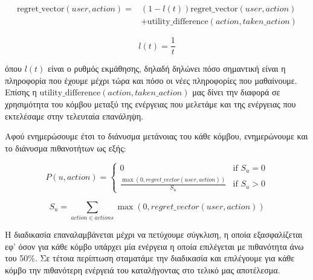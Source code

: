 \begin{equation}
\begin{split}
    \text{regret\_vector}(user, action) =& \left(1 - l(t)\right) \text{regret\_vector}(user, action)\\
    &+ \text{utility\_difference}(action, taken\_action)
\end{split}
\label{eq27}
\end{equation}

\vspace{-3pt}

\[l(t) = \frac{1}{t}\]

\noindent
όπου $l(t)$ είναι ο ρυθμός εκμάθησης, δηλαδή δηλώνει πόσο σημαντική είναι η πληροφορία που έχουμε μέχρι τώρα και πόσο οι νέες πληροφορίες που μαθαίνουμε. Επίσης η $\text{utility\_difference}(action, taken\_action)$ μας δίνει την διαφορά σε χρησιμότητα του κόμβου μεταξύ της ενέργειας που μελετάμε και της ενέργειας που εκτελέσαμε στην τελευταία επανάληψη. 

Αφού ενημερώσουμε έτσι το διάνυσμα μετάνοιας του κάθε κόμβου, ενημερώνουμε και το διάνυσμα πιθανοτήτων ως εξής:

\vspace{-5pt}

\begin{equation}
P(u,action) =
\begin{cases}
    0 & \text{if } S_u = 0 \\
    \frac{\max(0, regret\_vector(user, action))}{S_u} & \text{if } S_u > 0
\end{cases}
\label{eq28}
\end{equation}

\vspace{-3pt}

\[S_u = \sum_{action \in actions} \max(0, regret\_vector(user, action))\]

Η διαδικασία επαναλαμβάνεται μέχρι να πετύχουμε σύγκλιση, η οποία εξασφαλίζεται εφ' όσον για κάθε κόμβο υπάρχει μία ενέργεια η οποία επιλέγεται με πιθανότητα άνω του 50\%. Σε τέτοια περίπτωση σταματάμε την διαδικασία και επιλέγουμε για κάθε κόμβο την πιθανότερη ενέργειά του καταλήγοντας στο τελικό μας αποτέλεσμα.

